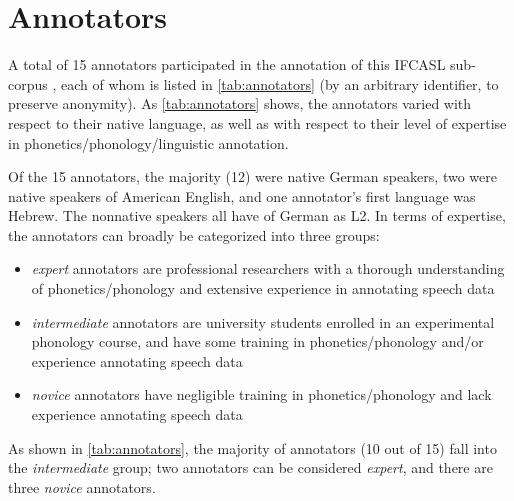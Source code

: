 	\section{Annotators}
	\label{sec:lexstress:annotators}
	
	A total of 15 annotators participated in the annotation of this IFCASL sub-corpus ,
	each of whom is listed in \cref{tab:annotators} (by an arbitrary identifier, to preserve anonymity).
	As \cref{tab:annotators} shows, the annotators varied with respect to their native language, as well as with respect to their level of expertise in phonetics/phonology/linguistic annotation. 
	 
	Of the 15 annotators, the majority (12) were native German speakers, two were native speakers of American English, and one annotator's first language was Hebrew. The nonnative speakers all have   of German as L2.
	In terms of expertise, the annotators can broadly be categorized into three groups: 
	\begin{itemize}
	\item{\textit{expert} annotators are professional researchers with a thorough understanding of phonetics/phonology and extensive experience in annotating speech data}
	\item{\textit{intermediate} annotators are university students enrolled in an experimental phonology course,
	and have some training in phonetics/phonology and/or experience annotating speech data}
	\item{\textit{novice} annotators have negligible training in phonetics/phonology and lack experience annotating speech data}
	\end{itemize}
	As shown in \cref{tab:annotators}, the majority of annotators (10 out of 15) fall into the \textit{intermediate} group; two annotators can be considered \textit{expert}, and there are three \textit{novice} annotators.
	
